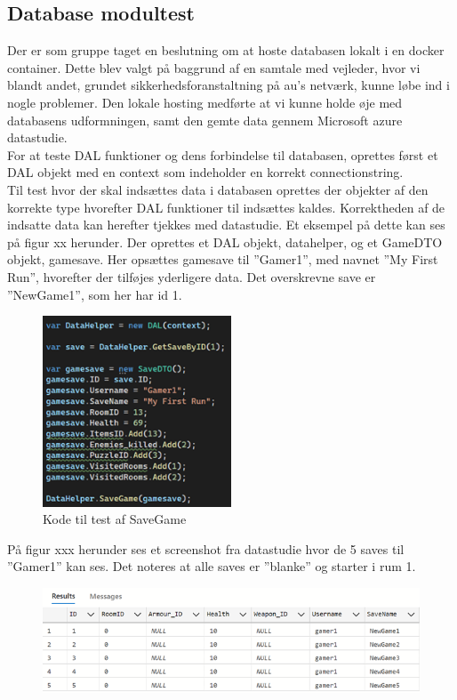 \subsection{Database modultest}
Der er som gruppe taget en beslutning om at hoste databasen lokalt i en docker container. Dette blev valgt på baggrund af en samtale med vejleder, hvor vi blandt andet, grundet sikkerhedsforanstaltning på au’s netværk, kunne løbe ind i nogle problemer.
Den lokale hosting medførte at vi kunne holde øje med databasens udformningen, samt den gemte data gennem Microsoft azure datastudie.\\

For at teste DAL funktioner og dens forbindelse til databasen, oprettes først et DAL objekt med en context som indeholder en korrekt connectionstring.\\

Til test hvor der skal indsættes data i databasen oprettes der objekter af den korrekte type hvorefter DAL funktioner til indsættes kaldes. Korrektheden af de indsatte data kan herefter tjekkes med datastudie.
Et eksempel på dette kan ses på figur xx herunder.
Der oprettes et DAL objekt, datahelper, og et GameDTO objekt, gamesave.
Her opsættes gamesave til ”Gamer1”, med navnet ”My First Run”, hvorefter der tilføjes yderligere data. Det overskrevne save er ”NewGame1”, som her har id 1.

\begin{figure}[H]
\centering
\includegraphics[width = 0.5\textwidth]{02-Body/Images/DAL-Database/NewSave.png}
\caption{Kode til test af SaveGame}
\label{fig:SaveGame-test}
\end{figure}

På figur xxx herunder ses et screenshot fra datastudie hvor de 5 saves til ”Gamer1” kan ses.
Det noteres at alle saves er ”blanke” og starter i rum 1.

\begin{figure}[H]
\centering
\includegraphics[width = \textwidth]{02-Body/Images/DAL-Database/DatastudieFørIndsættelse.png}
\caption{}
\label{fig:}
\end{figure}

